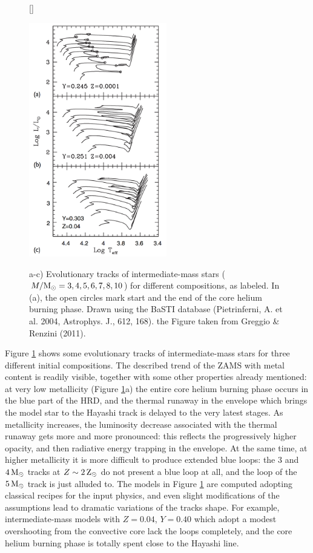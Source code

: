 \documentclass[a4paper,10pt]{article}
\begin{document}
\begin{figure}[h]
    [\FBwidth]
    {\caption{\footnotesize{a-c) Evolutionary tracks of intermediate-mass stars ($M/{\rm M_\odot}=3,4,5,6,7,8,10$) for different compositions, as labeled. In (a), the open circles mark start and the end of the core helium burning phase. Drawn using the BaSTI database (Pietrinferni, A. et al. 2004, Astrophys. J., 612, 168). the Figure taken from Greggio \& Renzini (2011).}}
    \label{fig:hrdz_int}}
    {\includegraphics[width=6cm]{figures/HRD_Z_int.png}}
\end{figure}

{\noindent}Figure \ref{fig:hrdz_int} shows some evolutionary tracks of intermediate-mass stars for three different initial compositions. The described trend of the ZAMS with metal content is readily visible, together with some other properties already mentioned: at very low metallicity (Figure \ref{fig:hrdz_int}a) the entire core helium burning phase occurs in the blue part of the HRD, and the thermal runaway in the envelope which brings the model star to the Hayashi track is delayed to the very latest stages. As metallicity increases, the luminosity decrease associated with the thermal runaway gets more and more pronounced: this reflects the progressively higher opacity, and then radiative energy trapping in the envelope. At the same time, at higher metallicity it is more difficult to produce extended blue loops: the $3$ and $4\,{\rm M_\odot}$ tracks at $Z\sim2\,{\rm Z_\odot}$ do not present a blue loop at all, and the loop of the $5\,{\rm M_\odot}$ track is just alluded to. The models in Figure \ref{fig:hrdz_int} are computed adopting classical recipes for the input physics, and even slight modifications of the assumptions lead to dramatic variations of the tracks shape. For example, intermediate-mass models with $Z=0.04$, $Y=0.40$ which adopt a modest overshooting from the convective core lack the loops completely, and the core helium burning phase is totally spent close to the Hayashi line.
\end{document}
